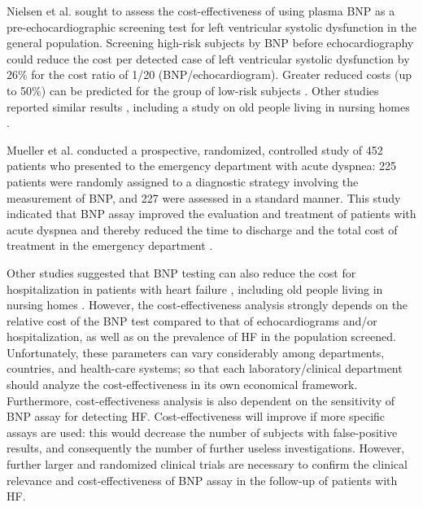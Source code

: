 \documentclass[14pt,a4paper,onecolumn]{extarticle}
\begin{document}
Nielsen et al. \citep{bib392} sought to assess the cost-effectiveness of using plasma BNP as a pre-echocardiographic screening test for left ventricular systolic dysfunction in the general population. Screening high-risk subjects by BNP before echocardiography could reduce the cost per detected case of left ventricular systolic dysfunction by 26\% for the cost ratio of 1/20 (BNP/echocardiogram). Greater reduced costs (up to 50\%) can be predicted for the group of low-risk subjects \citep{bib392}. Other studies reported similar results \citep{bib393} \citep{bib3145}, including a study on old people living in nursing homes \citep{bib3147}.



Mueller et al. conducted a prospective, randomized, controlled study of 452 patients who presented to the emergency department with acute dyspnea: 225 patients were randomly assigned to a diagnostic strategy involving the measurement of BNP, and 227 were assessed in a standard manner. This study indicated that BNP assay improved the evaluation and treatment of patients with acute dyspnea and thereby reduced the time to discharge and the total cost of treatment in the emergency department \citep{Mueller2004}.



Other studies suggested that BNP testing can also reduce the cost for hospitalization in patients with heart failure \citep{bib3263} \citep{bib3264}, including old people living in nursing homes \citep{bib3147}.  However, the cost-effectiveness analysis strongly depends on the relative cost of the BNP test compared to that of echocardiograms and/or hospitalization, as well as on the prevalence of HF in the population screened. Unfortunately, these parameters can vary considerably among departments, countries, and health-care systems; so that each laboratory/clinical department should analyze the cost-effectiveness in its own economical framework. Furthermore, cost-effectiveness analysis is also dependent on the sensitivity of BNP assay for detecting HF. Cost-effectiveness will improve if more specific assays are used: this would decrease the number of subjects with false-positive results, and consequently the number of further useless investigations. However, further larger and randomized clinical trials are necessary to confirm the clinical relevance and cost-effectiveness of BNP assay in the follow-up of patients with HF.



\end{document}
